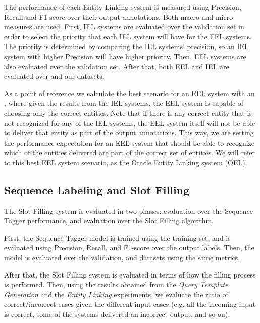 The performance of each Entity Linking system is measured using Precision, Recall and F1-score 
over their output annotations. Both macro and micro measures are used. First, IEL systems are 
evaluated over the \LCQuADtwo{} validation set in order to select the priority that each IEL system 
will have for the EEL systems. The priority is determined by comparing the IEL systems’ precision, 
so an IEL system with higher Precision will have higher priority. Then, EEL systems are also 
evaluated over the \LCQuADtwo{} validation set. After that, both EEL and IEL are evaluated over 
\QALDseven{} and our \WikiSPARQL{} datasets.

As a point of reference we calculate the best scenario for an EEL system with an , 
where given the results from the IEL systems, the EEL system is capable of choosing only the 
correct entities. Note that if there is any correct entity that is not recognized for any of the 
IEL systems, the EEL system itself will not be able to deliver that entity as part of the output 
annotations. This way, we are setting the performance expectation for an EEL system that should 
be able to recognize which of the entities delivered are part of the correct set of entities. We 
will refer to this best EEL system scenario, as the Oracle Entity Linking system (OEL).


\subsection{Sequence Labeling and Slot Filling}
\label{cap4:experimentalDesign/seqLabAndSlotFilling}
The Slot Filling system is evaluated in two phases: evaluation over the Sequence Tagger 
performance, and evaluation over the Slot Filling algorithm. 

First, the Sequence Tagger model is trained using the \LCQuADtwo{} training set, and is evaluated 
using Precision, Recall, and F1-score over the output labels. Then, the model is evaluated over 
the \LCQuADtwo{} validation, \QALDseven{} and \WikiSPARQL{} datasets using the same metrics.

After that, the Slot Filling system is evaluated in terms of how the filling process is performed. 
Then, using the results obtained from the \textit{Query Template Generation} and the 
\textit{Entity Linking} experiments, we evaluate the ratio of correct/incorrect cases given the 
different input cases (e.g. all the incoming input is correct, some of the systems delivered an 
incorrect output, and so on).


